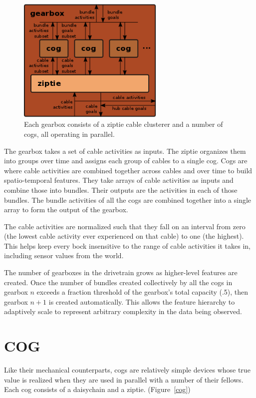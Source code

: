 \documentclass[oneside,twocolumn]{article}
\begin{document}
\begin{figure}[ht]
\centering
\includegraphics[height=6.0cm]{figs/gearbox.png}
\caption{Each gearbox consists of a ziptie cable clusterer and a number of cogs, all operating in parallel.}
\label{gearbox}
\end{figure}

The gearbox takes a set of cable activities as inputs. The ziptie organizes them into groups over time and assigns each group of cables to a single cog. Cogs are where cable activities are combined together across cables and over time to build spatio-temporal features. They take arrays of cable activities as inputs and combine those into bundles. Their outputs are the activities in each of those bundles. The bundle activities of all the cogs are combined together into a single array to form the output of the gearbox.

The cable activities are normalized such that they fall on an interval from zero (the lowest cable activity ever experienced on that cable) to one (the highest). This helps keep every bock  insensitive to the range of cable activities it takes in, including sensor values from the world.

The number of gearboxes in the drivetrain grows as higher-level features are created. Once the number of bundles created collectively by all the cogs in gearbox $n$ exceeds a fraction threshold of the gearbox's total capacity (.5), then gearbox $n+1$ is created automatically. This allows the feature hierarchy to adaptively scale to represent arbitrary complexity in the data being observed. 

\section*{\color{copper} COG}

Like their mechanical counterparts, cogs are relatively simple devices whose true value is realized when they are used in parallel with a number of their fellows. Each cog consists of a daisychain and a ziptie. (Figure~\ref{cog}) 
\end{document}
